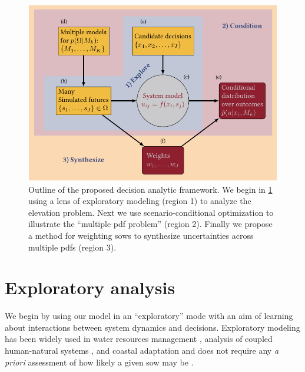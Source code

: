 \documentclass[11pt]{article}
\begin{document}
\begin{figure}
    \centering
    \includegraphics[width=\textwidth]{bayes-rdm.pdf}
    \caption{
        Outline of the proposed decision analytic framework.
        We begin in \cref{sec:exploratory} using a lens of exploratory modeling (region 1) to analyze the elevation problem.
        Next we use scenario-conditional optimization to illustrate the ``multiple \acrshort{pdf} problem'' (region 2).
        Finally we propose a method for weighting \glspl{sow} to synthesize uncertainties across multiple \glspl{pdf} (region 3).
    }\label{fig:flowchart}
\end{figure}

\section{Exploratory analysis}\label{sec:exploratory}

We begin by using our model in an ``exploratory'' mode with an aim of learning about interactions between system dynamics and decisions.
Exploratory modeling has been widely used in water resources management \citep{Brown:2012kb,Poff:2015jn,quinn_exploratory:2020,Steinschneider:2015kk}, analysis of coupled human-natural systems \citep{moallemi_exploratory:2020,moallemi_decisionsupport:2020}, and coastal adaptation \citep{sriver_sealevel:2018} and does not require any \emph{a priori} assessment of how likely a given \gls{sow} may be \citep{bankes:1993,kwakkel_exploratory:2013,reed_multisectordynamics:2022}.
\end{document}
